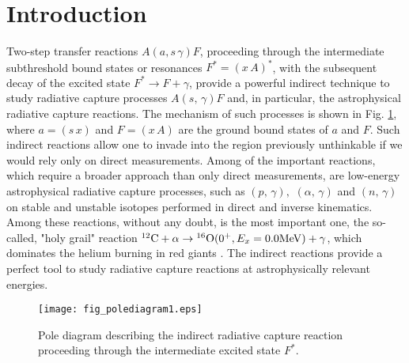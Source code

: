 \documentclass[prl,unsortedaddress,groupedaddress,twocolumn,amsmath,amsfonts,amssymb,showpacs,floatfix,nofootinbib]{revtex4}
\begin{document}
\maketitle

\section{Introduction}
Two-step transfer reactions $A(a,s\,\gamma)F$, proceeding through the intermediate subthreshold bound states or resonances $F^{*}= (x\,A)^{*}$, with the subsequent decay of the excited state $F^{*} \to F + \gamma$, provide a powerful indirect technique to study radiative capture processes $A(s,\,\gamma)F$ and, in particular, the astrophysical radiative capture reactions. The mechanism of such processes
is shown in Fig. \ref{fig:fig_polediagram1}, where $a=(s\,x)$ and $F=(x\,A)$ are the ground bound states of $a$ and $F$.
Such indirect reactions allow one to invade into the region previously unthinkable if we would rely only on direct measurements. Among of the important reactions, which require a broader approach than only direct measurements, are low-energy astrophysical radiative capture processes, such as $(p,\,\gamma), \,\,(\alpha,\,\gamma)$ and $(n,\,\gamma)$ on stable and unstable isotopes performed in direct and inverse kinematics. Among these reactions, without any doubt, is the most important one, the so-called, "holy grail" reaction ${}^{12}{\rm C} + \alpha \to  {}^{16}{\rm O}(0^{+}, E_{x}=0.0 {\rm MeV}) + \gamma$, which dominates the helium burning in red giants \cite{rolfssydney}. The indirect reactions provide a perfect tool to study radiative capture reactions at astrophysically relevant energies.
 

\begin{figure}[tbp] %
  \centering
 \texttt{[image: fig\_polediagram1.eps]}
  \caption{Pole diagram describing the indirect radiative capture reaction proceeding through
the intermediate excited state $F^{*}$. }
  \label{fig:fig_polediagram1}
\end{figure}
\end{document}
